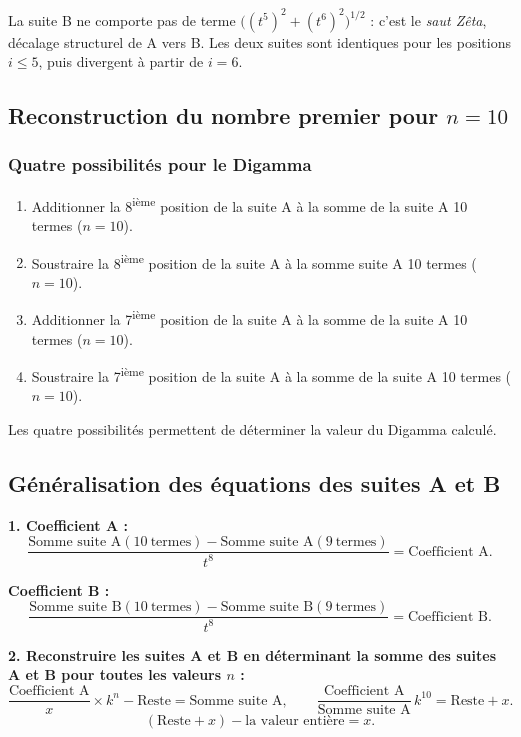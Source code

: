 \documentclass[11pt,a4paper]{article}
\begin{document}
\vspace{0.3cm}
\begin{boitenote}
La suite B ne comporte pas de terme $\bigl((t^{5})^{2}+(t^{6})^{2}\bigr)^{1/2}$ :
c'est le \emph{saut Zêta}, décalage structurel de A vers B. Les deux suites sont
identiques pour les positions $i \le 5$, puis divergent à partir de $i = 6$.


\subsection{Reconstruction du nombre premier pour $n = 10$}

\subsubsection{Quatre possibilités pour le Digamma}

\begin{enumerate}[nosep]
  \item Additionner la 8\textsuperscript{ième} position de la suite A à la somme de la suite A 10 termes ($n=10$).
  \item Soustraire la 8\textsuperscript{ième} position de la suite A à la somme suite A 10 termes ($n=10$).
  \item Additionner la 7\textsuperscript{ième} position de la suite A à la somme de la suite A 10 termes ($n=10$).
  \item Soustraire la 7\textsuperscript{ième} position de la suite A à la somme de la suite A 10 termes ($n=10$).
\end{enumerate}

Les quatre possibilités permettent de déterminer la valeur du Digamma calculé.

\subsection{Généralisation des équations des suites A et B}

\textbf{1. Coefficient A :}
\[
\frac{\text{Somme suite A}(10\ \text{termes}) - \text{Somme suite A}(9\ \text{termes})}{t^{8}}
= \text{Coefficient A}.
\]

\textbf{Coefficient B :}
\[
\frac{\text{Somme suite B}(10\ \text{termes}) - \text{Somme suite B}(9\ \text{termes})}{t^{8}}
= \text{Coefficient B}.
\]

\textbf{2. Reconstruire les suites A et B en déterminant la somme des suites A
et B pour toutes les valeurs $n$ :}
\[
\frac{\text{Coefficient A}}{x} \times k^{n} - \text{Reste} = \text{Somme suite A},
\qquad
\frac{\text{Coefficient A}}{\text{Somme suite A}}\, k^{10} = \text{Reste} + x .
\]
\[
(\text{Reste} + x) - \text{la valeur entière} = x .
\]


\end{boitenote}
\end{document}
